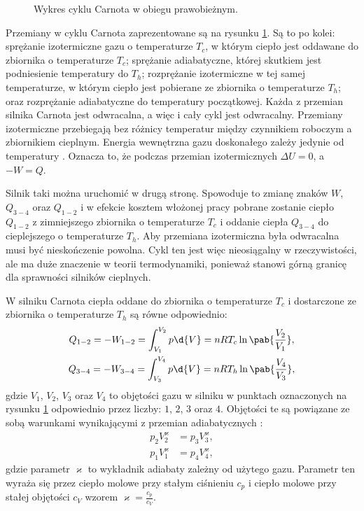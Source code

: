 \begin{figure}
	\centering
	
	\caption{Wykres cyklu Carnota w obiegu prawobieżnym.}
	\label{fig:pv_silnik_carnot}
\end{figure}

Przemiany w cyklu Carnota zaprezentowane są na rysunku \ref{fig:pv_silnik_carnot}. Są to po kolei: sprężanie izotermiczne gazu o temperaturze \(T_c\), w którym ciepło jest oddawane do zbiornika o temperaturze \(T_c\); sprężanie adiabatyczne, której skutkiem jest podniesienie temperatury do \(T_h\); rozprężanie izotermiczne w tej samej temperaturze, w którym ciepło jest pobierane ze zbiornika o temperaturze \(T_h\); oraz rozprężanie adiabatyczne do temperatury początkowej. Każda z przemian silnika Carnota jest odwracalna, a więc i cały cykl jest odwracalny. Przemiany izotermiczne przebiegają bez różnicy temperatur między czynnikiem roboczym a zbiornikiem cieplnym. Energia wewnętrzna gazu doskonałego zależy jedynie od temperatury \cite{b:kondepudi_prigogine_modern_thermodynamics}. Oznacza to, że podczas przemian izotermicznych \(\Delta U = 0\), a \(- W = Q\).

Silnik taki można uruchomić w drugą stronę. Spowoduje to zmianę znaków \(W\), \(Q_{3-4}\) oraz \(Q_{1-2}\) i w efekcie kosztem włożonej pracy pobrane zostanie ciepło \(Q_{1-2}\) z zimniejszego zbiornika o temperaturze \(T_c\) i oddanie ciepła \(Q_{3-4}\) do cieplejszego o temperaturze \(T_h\). Aby przemiana izotermiczna była odwracalna musi być nieskończenie powolna. Cykl ten jest więc nieosiągalny w rzeczywistości, ale ma duże znaczenie w teorii termodynamiki, ponieważ stanowi górną granicę dla sprawności silników cieplnych.

W silniku Carnota ciepła oddane do zbiornika o temperaturze \(T_c\) i dostarczone ze zbiornika o temperaturze \(T_h\) są równe odpowiednio:
\begin{gather}
	Q_{1-2} = - W_{1-2} = \int_{V_1}^{V_2} p \d{V} = nRT_c \ln\pab{\frac{V_2}{V_1}}, \\
	Q_{3-4} = - W_{3-4} = \int_{V_3}^{V_4} p \d{V} = nRT_h \ln\pab{\frac{V_4}{V_3}},
\end{gather}
gdzie \(V_1\), \(V_2\), \(V_3\) oraz \(V_4\) to objętości gazu w silniku w punktach oznaczonych na rysunku \ref{fig:pv_silnik_carnot} odpowiednio przez liczby: \(1\), \(2\), \(3\) oraz \(4\). Objętości te są powiązane ze sobą warunkami wynikającymi z przemian adiabatycznych \cite{b:pudlik_termodynamika}:
\begin{align}
	p_{2}V_{2}^{\varkappa} &= p_{3}V_{3}^{\varkappa}, \\
	p_{1}V_{1}^{\varkappa} &= p_{4}V_{4}^{\varkappa},
\end{align}
gdzie parametr \(\varkappa\) to wykładnik adiabaty zależny od użytego gazu. Parametr ten wyraża się przez ciepło molowe przy stałym ciśnieniu \(c_p\) i ciepło molowe przy stałej objętości \(c_V\) wzorem \(\varkappa = \frac{c_p}{c_V}\).

